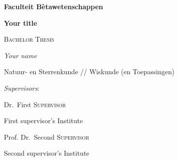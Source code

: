 \documentclass[thesis]{subfiles}
\begin{document}
\begin{titlepage}
    \begin{flushright}
    {\LARGE\bfseries Faculteit B\`etawetenschappen \par} %
    \end{flushright}
	\vspace{1cm}
    \begin{center}
    {\huge\bfseries Your title \par} %
    \end{center}
	\vspace{1cm}
    {\scshape\Large Bachelor Thesis\par}
	\vspace{0.75cm} %
	{\Large\itshape Your name\par} %
    \vspace{0.5cm}
    {\Large Natuur- en Sterrenkunde // Wiskunde (en Toepassingen)}\par %
    \vspace{0.5cm}
    \centering
    \vspace{0.5cm}
    \par
    \raggedleft
	{\Large\itshape Supervisors}:\par\vspace{0.25cm}
	{\large Dr.~First \textsc{Supervisor}\par} %
    First supervisor's Institute\par %
    \vspace{0.25cm}
    {\large Prof. Dr.~Second \textsc{Supervisor}\par} %
    Second supervisor's Institute %


\end{titlepage}
\end{document}
